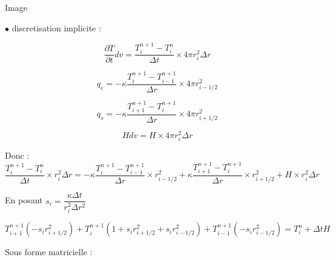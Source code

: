 \documentclass[legalpaper,12pt]{article}
\begin{document}
	
	Image
	
	$\bullet$ discretisation implicite : 
	
	\begin{equation}
		\dfrac{\partial T}{\partial t}  dv = \dfrac{T^{n+1}_{i} - T^{n}_{i}}{\Delta t} \times 4\pi r_{i}^{2} \Delta r 
	\end{equation}
	
	\begin{equation}
		q_{e} = - \kappa \dfrac{T^{n+1}_{i} - T^{n+1}_{i-1}}{\Delta r} \times 4\pi r_{i-1/2}^{2} 
	\end{equation}
	
	\begin{equation}
		q_{s} = - \kappa \dfrac{T^{n+1}_{i+1} - T^{n+1}_{i}}{\Delta r} \times 4\pi r_{i+1/2}^{2} 
	\end{equation}
	
	\begin{equation}
		H dv = H  \times 4\pi r_{i}^{2} \Delta r 
	\end{equation}
	
	Donc : 
	\begin{equation}
		\dfrac{T^{n+1}_{i} - T^{n}_{i}}{\Delta t} \times r_{i}^{2} \Delta r  = - \kappa \dfrac{T^{n+1}_{i} - T^{n+1}_{i-1}}{\Delta r} \times  r_{i-1/2}^{2} + \kappa \dfrac{T^{n+1}_{i+1} - T^{n+1}_{i}}{\Delta r} \times  r_{i+1/2}^{2} +H  \times  r_{i}^{2} \Delta r 
	\end{equation}
	
	En posant $s_{i} = \dfrac{\kappa \Delta t}{r_{i}^{2} \Delta r^{2}}$
	
	\begin{equation}
		T_{i+1}^{n+1}(-s_{i}r_{i+1/2}^{2}) + T_{i}^{n+1}(1 + s_{i}r_{i+1/2}^{2} + s_{i}r_{i-1/2}^{2}) + T_{i-1}^{n+1}(-s_{i}r_{i-1/2}^{2}) = T_{i}^{n} + \Delta t H
	\end{equation}
	
	Sous forme matricielle : \newline
	
\end{document}
